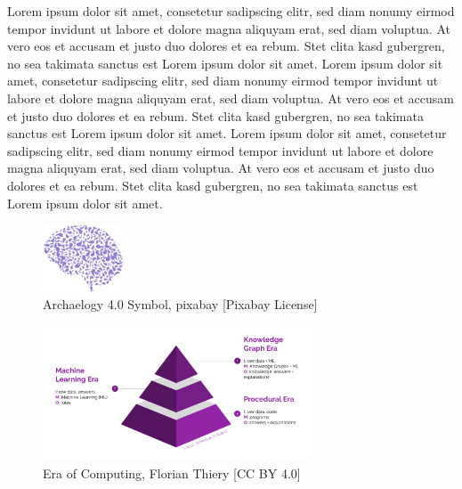 \documentclass[twocolumn]{autart}
\begin{document}
Lorem ipsum dolor sit amet, consetetur sadipscing elitr, sed diam nonumy eirmod tempor invidunt ut labore et dolore magna aliquyam erat, sed diam voluptua. At vero eos et accusam et justo duo dolores et ea rebum. Stet clita kasd gubergren, no sea takimata sanctus est Lorem ipsum dolor sit amet. Lorem ipsum dolor sit amet, consetetur sadipscing elitr, sed diam nonumy eirmod tempor invidunt ut labore et dolore magna aliquyam erat, sed diam voluptua. At vero eos et accusam et justo duo dolores et ea rebum. Stet clita kasd gubergren, no sea takimata sanctus est Lorem ipsum dolor sit amet. Lorem ipsum dolor sit amet, consetetur sadipscing elitr, sed diam nonumy eirmod tempor invidunt ut labore et dolore magna aliquyam erat, sed diam voluptua. At vero eos et accusam et justo duo dolores et ea rebum. Stet clita kasd gubergren, no sea takimata sanctus est Lorem ipsum dolor sit amet. 

\cite{mccreary_computing}

\cite{hey_computing}

\begin{figure}[!htb]
\begin{center}
\includegraphics[height=2cm]{a40.png}    %
\caption{Archaelogy 4.0 Symbol, pixabay [Pixabay License]}  %
\label{figa40symbol}                                 %
\end{center}                                 %
\end{figure}

\begin{figure}[!htb]
\begin{center}
\includegraphics[width=8cm]{Era_of_Computing.png}    %
\caption{Era of Computing, Florian Thiery [CC BY 4.0]}  %
\label{figeoc}                                 %
\end{center}                                 %
\end{figure}
\end{document}
